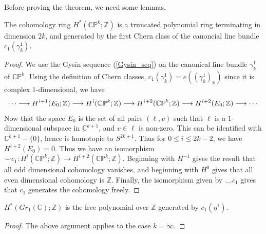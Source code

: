 	Before proving the theorem, we need some lemmas. 
	\begin{lemma}
		The cohomology ring $H^*(\mathbb{CP}^k;\mathbb{Z})$ is a truncated polynomial ring terminating in dimension $2k$, and generated by the first Chern class of the canoncial line bundle $c_1(\gamma_k^1)$. 
	\end{lemma}
	\begin{proof}
		We use the Gysin sequence (\cref{Gysin_seq}) on the canonical line bundle $\gamma_k^1$ of $\mathbb{CP}^k$. Using the definition of Chern classes, $c_1(\gamma_k^1)=e((\gamma_k^1)_\mathbb{R})$ since it is complex $1$-dimensional, we have 
		\[ \cdots\longrightarrow H^{i+1}(E_0;\mathbb{Z})\longrightarrow H^i(\mathbb{CP}^k;\mathbb{Z})\longrightarrow H^{i+2}(\mathbb{CP}^k;\mathbb{Z})\longrightarrow H^{i+2}(E_0;\mathbb{Z})\longrightarrow\cdots \]
		Now that the space $E_0$ is the set of all pairs $(\ell,v)$ such that $\ell$ is a $1$-dimensional subspace in $\mathbb{C}^{k+1}$, and $v\in\ell$ is non-zero. This can be identified with $\mathbb{C}^{k+1}-\{0\}$, hence is homotopic to $S^{2k+1}$. Thus for $0\le i\le 2k-2$, we have $H^{i+2}(E_0)=0$. Thus we have an isomorphism $\smile c_1:H^i(\mathbb{CP}^k;\mathbb{Z})\to H^{i+2}(\mathbb{CP}^k;\mathbb{Z})$. Beginning with $H^{-1}$ gives the result that all odd dimensional cohomology vanishes, and beginning with $H^0$ gives that all even dimensional cohomology is $\mathbb{Z}$. Finally, the isomorphism given by $\smile c_1$ gives that $c_1$ generates the cohomology freely. 
	\end{proof}
	\begin{coro}
		$H^*(Gr_1(\mathbb{C});\mathbb{Z})$ is the free polynomial over $\mathbb{Z}$ generated by $c_1(\eta^1)$. 
	\end{coro}
	\begin{proof}
		The above argument applies to the case $k=\infty$. 
	\end{proof}
	
